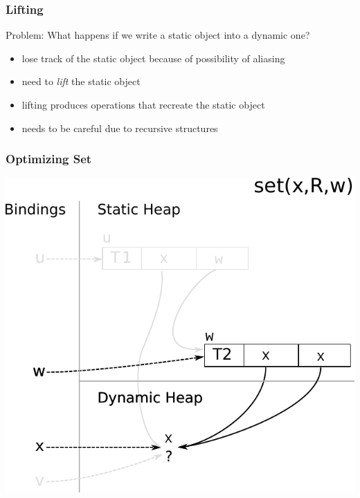 \documentclass[utf8x]{beamer}
\begin{document}
\begin{frame}
  \frametitle{Lifting}
  Problem: What happens if we write a static object into a dynamic one?
  \pause
  \begin{itemize}
      \item lose track of the static object because of possibility of aliasing
      \item need to \emph{lift} the static object
      \item lifting produces operations that recreate the static object
      \pause
      \item needs to be careful due to recursive structures
  \end{itemize}
\end{frame}


\begin{frame}[plain]
  \frametitle{Optimizing Set}
  \includegraphics[scale=0.8]{figures/opt_set_dynamic1}
\end{frame}
\end{document}
